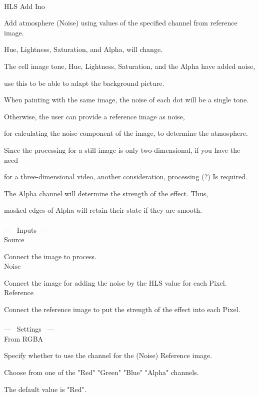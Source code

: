 \documentclass[a4paper,12pt]{article}
\begin{document}
\thispagestyle{empty}

\Large
\noindent \\
HLS Add Ino\medskip
\par
\normalsize
Add atmosphere (Noise) using values of the specified channel from reference image.\par
Hue, Lightness, Saturation, and Alpha, will change.\\
\par
The cell image tone, Hue, Lightness, Saturation, and the Alpha have added noise,\par
use this to be able to adapt the background picture.\par
When painting with the same image, the noise of each dot will be a single tone.\par
Otherwise, the user can provide a reference image as noise,\par
for calculating the noise component of the image, to determine the atmosphere.
\\
\par
Since the processing for a still image is only two-dimensional, if you have the need\par
for a three-dimensional video, another consideration, processing (?) Is required.\\
\par
The Alpha channel will determine the strength of the effect. Thus,\par
masked edges of Alpha will retain their state if they are smooth.\\
\\
--- \ Inputs \ ---\\
Source\par
Connect the image to process.\\
Noise\par
Connect the image for adding the noise by the HLS value for each Pixel.\\
Reference\par
Connect the reference image to put the strength of the effect into each Pixel.\\
\\
--- \ Settings \ ---\\
From RGBA\par
Specify whether to use the channel for the (Noise) Reference image.\par
Choose from one of the "Red" "Green" "Blue" "Alpha" channels.\par
The default value is "Red".\\
\end{document}
